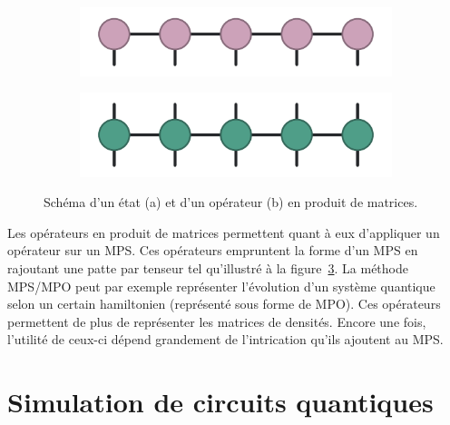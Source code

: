 \begin{figure}[h]
    \centering
    \begin{subfigure}[h]{0.7\textwidth}
        \centering
        \caption{}
        \includegraphics[width=1\textwidth]{figures/mps.pdf}
        \label{fig:mps}
    \end{subfigure}
    \begin{subfigure}[h]{0.7\textwidth}
        \centering
        \caption{}
        \includegraphics[width=1\textwidth]{figures/mpo.pdf}
        \label{fig:mpo}
    \end{subfigure}
    \caption[État et opérateur en produit de matrices]{Schéma d'un état (a) et d'un opérateur (b) en produit de matrices.}
\end{figure}

Les opérateurs en produit de matrices permettent quant à eux d'appliquer un opérateur sur un MPS. Ces opérateurs empruntent la forme d'un MPS en rajoutant une patte par tenseur tel qu'illustré à la figure~\ref{fig:mpo}. La méthode MPS/MPO peut par exemple représenter l'évolution d'un système quantique selon un certain hamiltonien (représenté sous forme de MPO). Ces opérateurs permettent de plus de représenter les matrices de densités. Encore une fois, l'utilité de ceux-ci dépend grandement de l'intrication qu'ils ajoutent au MPS.


\section{Simulation de circuits quantiques}
\label{sec:simulation-de-circuits-quantiques}


